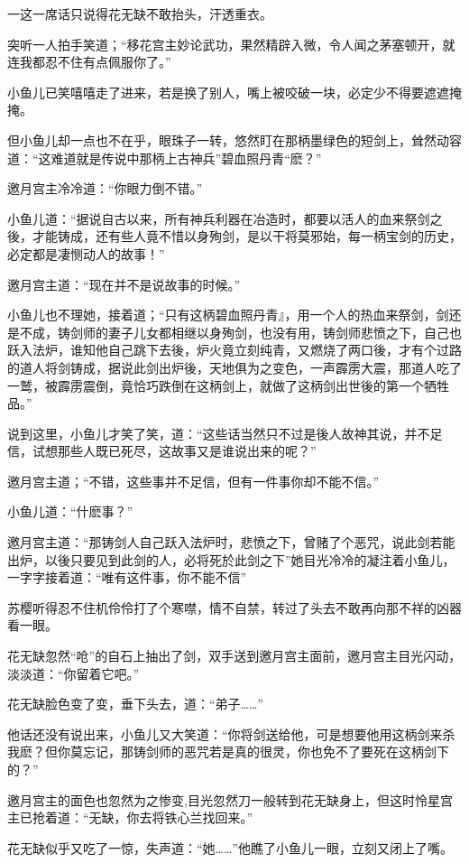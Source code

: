 \documentclass[12pt,oneside]{book}
\begin{document}
一这一席话只说得花无缺不敢抬头，汗透重衣。

突听一人拍手笑道；``移花宫主妙论武功，果然精辟入微，令人闻之茅塞顿开，就连我都忍不住有点佩服你了。''

小鱼儿已笑嘻嘻走了进来，若是换了别人，嘴上被咬破一块，必定少不得要遮遮掩掩。

但小鱼儿却一点也不在乎，眼珠子一转，悠然盯在那柄墨绿色的短剑上，耸然动容道：``这难道就是传说中那柄上古神兵''碧血照丹青``麽？''

邀月宫主冷冷道：``你眼力倒不错。''

小鱼儿道：``据说自古以来，所有神兵利器在冶造时，都要以活人的血来祭剑之後，才能铸成，还有些人竟不惜以身殉剑，是以干将莫邪始，每一柄宝剑的历史，必定都是凄恻动人的故事！''

邀月宫主道：``现在并不是说故事的时候。''

小鱼儿也不理她，接着道；``只有这柄碧血照丹青』，用一个人的热血来祭剑，剑还是不成，铸剑师的妻子儿女都相继以身殉剑，也没有用，铸剑师悲愤之下，自己也跃入法炉，谁知他自己跳下去後，炉火竟立刻纯青，又燃烧了两口後，才有个过路的道人将剑铸成，据说此剑出炉後，天地俱为之变色，一声霹雳大震，那道人吃了一鹫，被霹雳震倒，竟恰巧跌倒在这柄剑上，就做了这柄剑出世後的第一个牺牲品。''

说到这里，小鱼儿才笑了笑，道：``这些话当然只不过是後人故神其说，并不足信，试想那些人既已死尽，这故事又是谁说出来的呢？''

邀月宫主道；``不错，这些事并不足信，但有一件事你却不能不信。''

小鱼儿道：``什麽事？''

邀月宫主道：``那铸剑人自己跃入法炉时，悲愤之下，曾赌了个恶咒，说此剑若能出炉，以後只要见到此剑的人，必将死於此剑之下''她目光冷冷的凝注着小鱼儿，一字字接着道：``唯有这件事，你不能不信''

苏樱听得忍不住机伶伶打了个寒噤，情不自禁，转过了头去不敢再向那不祥的凶器看一眼。

花无缺忽然``呛''的自石上抽出了剑，双手送到邀月宫主面前，邀月宫主目光闪动，淡淡道：``你留着它吧。''

花无缺脸色变了变，垂下头去，道：``弟子\ldots\ldots{}''

他话还没有说出来，小鱼儿又大笑道：``你将剑送给他，可是想要他用这柄剑来杀我麽？但你莫忘记，那铸剑师的恶咒若是真的很灵，你也免不了要死在这柄剑下的？''

邀月宫主的面色也忽然为之惨变,目光忽然刀一般转到花无缺身上，但这时怜星宫主已抢着道：``无缺，你去将铁心兰找回来。''

花无缺似乎又吃了一惊，失声道：``她\ldots\ldots{}''他瞧了小鱼儿一眼，立刻又闭上了嘴。
\end{document}
